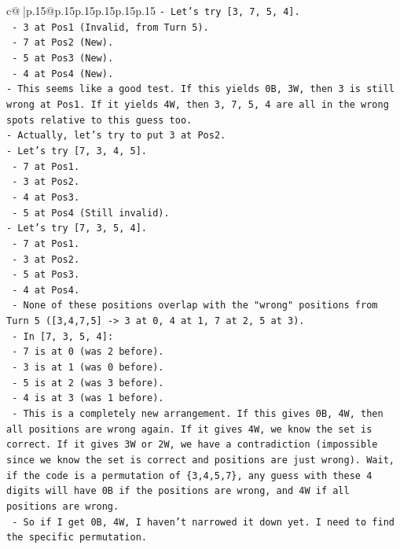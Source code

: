 \documentclass{article}
\begin{document}
{\begin{supertabular}{c@{$\;$}|p{.15\linewidth}@{}p{.15\linewidth}p{.15\linewidth}p{.15\linewidth}p{.15\linewidth}p{.15\linewidth}}
{{{\texttt{{-} Let's try {[}3, 7, 5, 4{]}.} \\
\texttt{  {-} 3 at Pos1 (Invalid, from Turn 5).} \\
\texttt{  {-} 7 at Pos2 (New).} \\
\texttt{  {-} 5 at Pos3 (New).} \\
\texttt{  {-} 4 at Pos4 (New).} \\
\texttt{{-} This seems like a good test. If this yields 0B, 3W, then 3 is still wrong at Pos1. If it yields 4W, then 3, 7, 5, 4 are all in the wrong spots relative to this guess too.} \\
\texttt{{-} Actually, let's try to put 3 at Pos2.} \\
\texttt{{-} Let's try {[}7, 3, 4, 5{]}.} \\
\texttt{  {-} 7 at Pos1.} \\
\texttt{  {-} 3 at Pos2.} \\
\texttt{  {-} 4 at Pos3.} \\
\texttt{  {-} 5 at Pos4 (Still invalid).} \\
\texttt{{-} Let's try {[}7, 3, 5, 4{]}.} \\
\texttt{  {-} 7 at Pos1.} \\
\texttt{  {-} 3 at Pos2.} \\
\texttt{  {-} 5 at Pos3.} \\
\texttt{  {-} 4 at Pos4.} \\
\texttt{  {-} None of these positions overlap with the "wrong" positions from Turn 5 ({[}3,4,7,5{]} {-}> 3 at 0, 4 at 1, 7 at 2, 5 at 3).} \\
\texttt{  {-} In {[}7, 3, 5, 4{]}:} \\
\texttt{    {-} 7 is at 0 (was 2 before).} \\
\texttt{    {-} 3 is at 1 (was 0 before).} \\
\texttt{    {-} 5 is at 2 (was 3 before).} \\
\texttt{    {-} 4 is at 3 (was 1 before).} \\
\texttt{  {-} This is a completely new arrangement. If this gives 0B, 4W, then all positions are wrong again. If it gives 4W, we know the set is correct. If it gives 3W or 2W, we have a contradiction (impossible since we know the set is correct and positions are just wrong). Wait, if the code is a permutation of \{3,4,5,7\}, any guess with these 4 digits will have 0B if the positions are wrong, and 4W if all positions are wrong.} \\
\texttt{  {-} So if I get 0B, 4W, I haven't narrowed it down yet. I need to find the specific permutation.} \\
}}}
\end{supertabular}}
\end{document}
